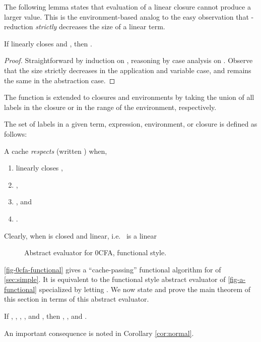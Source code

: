 The following lemma states that evaluation of a linear closure cannot
produce a larger value.  This is the environment-based analog to the
easy observation that -reduction {\em strictly} decreases the
size of a linear term.
\begin{lemma}\label{lem:smaller}
If  linearly closes  and , then
.
\end{lemma}
\begin{proof}
Straightforward by induction on , reasoning by case analysis
on .  Observe that the size strictly decreases in the application
and variable case, and remains the same in the abstraction case.
\end{proof}

The function  is extended to closures and environments by
taking the union of all labels in the closure or in the range of the
environment, respectively.

\begin{definition}
The set of labels in a given term, expression, environment, or closure
is defined as follows:

\end{definition}

\begin{definition}
  A cache  {\em respects} 
  (written ) when,
\begin{enumerate}
\item  linearly closes ,
\item ,
\item , and
\item .
\end{enumerate}
\end{definition}
Clearly,  when  is closed and linear,
i.e.~ is a linear 

\begin{figure}[h]

\caption{Abstract evaluator  for 0CFA, functional style.}
\label{fig-0cfa-functional}
\end{figure}

\autoref{fig-0cfa-functional} gives a ``cache-passing'' functional
algorithm for  of \autoref{sec:simple}.  It is equivalent
to the functional style abstract evaluator of
\autoref{fig-a-functional} specialized by letting .
We now state and prove the main theorem of this section in terms of
this abstract evaluator.

\begin{theorem}\label{thm:main}
  If , ,
  , , and ,
  then , , and
  .
\end{theorem}
An important consequence is noted in Corollary \ref{cor:normal}.

